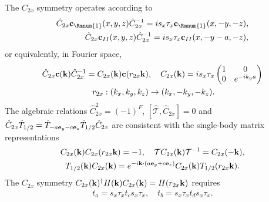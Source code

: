 The $C_{2x}$ symmetry operates according to 
\begin{align}
\hat{C}_{2x}{\bf c}_{\Rmnum{1}}(x,y,z)\hat{C}_{2x}^{-1}=is_x\tau_x{\bf c}_{\Rmnum{1}}(x,-y,-z),\\
\hat{C}_{2x}{\bf c}_{II}(x,y,z)\hat{C}_{2x}^{-1}=is_x\tau_x{\bf c}_{II}(x,-y-a,-z),
\end{align}
or equivalently, in Fourier space, 
\begin{align}
\hat{C}_{2x}{\bf c}({\bf k})\hat{C}_{2x}^{-1}=C_{2x}({\bf k}){\bf c}(r_{2x}{\bf k})&,\quad C_{2x}({\bf k})=is_x\tau_x
\begin{pmatrix}
1 & 0\\
0 & e^{-ik_ya}
\end{pmatrix}\\
r_{2x}:(k_x,k_y,k_z)&\to(k_x,-k_y,-k_z).
\end{align}
The algebraic relations $\hat{C}_{2x}^2=(-1)^F$, $[\hat{\mathcal{T}},\hat{C}_{2x}]=0$ and $\hat{C}_{2x}\hat{T}_{1/2}=\hat{T}_{-a{\bf e}_y-c{\bf e}_z}\hat{T}_{1/2}\hat{C}_{2x}$ are consistent with the single-body matrix representations 
\begin{gather}
C_{2x}({\bf k})C_{2x}(r_{2x}{\bf k})=-1,\quad\mathcal{T}C_{2x}({\bf k})\mathcal{T}^{-1}=C_{2x}(-{\bf k}),\nonumber\\T_{1/2}({\bf k})C_{2x}({\bf k})=e^{-i{\bf k}\cdot(a{\bf e}_y+c{\bf e}_z)}C_{2x}({\bf k})T_{1/2}(r_{2x}{\bf k}).
\end{gather} 
The $C_{2x}$ symmetry $C_{2x}({\bf k})^\dagger H({\bf k})C_{2x}({\bf k})=H(r_{2x}{\bf k})$ requires 
\begin{align}
t_a=s_x\tau_xt_cs_x\tau_x,\quad t_b=s_x\tau_xt_ds_x\tau_x.\label{C2xsymm}
\end{align} 

